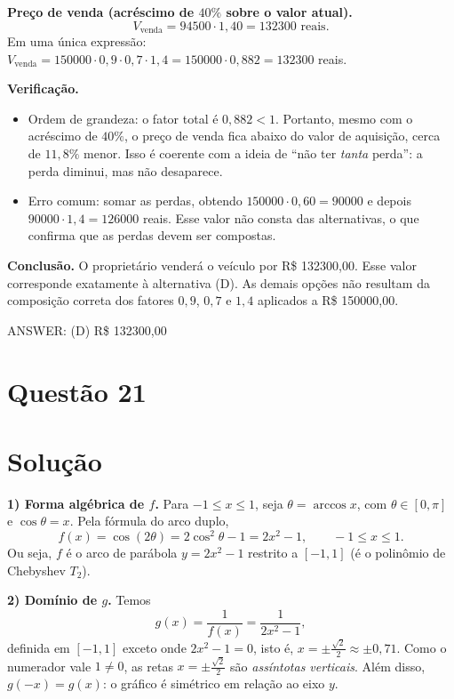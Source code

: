 \documentclass{article}%
\begin{document}
\textbf{Preço de venda (acréscimo de $40\%$ sobre o valor atual).}
\[
V_{\text{venda}} = 94500 \cdot 1{,}40 = 132300 \text{ reais}.
\]
Em uma única expressão: $V_{\text{venda}} = 150000\cdot 0{,}9\cdot 0{,}7\cdot 1{,}4 = 150000\cdot 0{,}882 = 132300$ reais.

\textbf{Verificação.}
\begin{itemize}
  \item Ordem de grandeza: o fator total é $0{,}882<1$. Portanto, mesmo com o acréscimo de $40\%$, o preço de venda fica abaixo do valor de aquisição, cerca de $11{,}8\%$ menor. Isso é coerente com a ideia de ``não ter \emph{tanta} perda'': a perda diminui, mas não desaparece.
  \item Erro comum: somar as perdas, obtendo $150000\cdot 0{,}60 = 90000$ e depois $90000\cdot 1{,}4 = 126000$ reais. Esse valor não consta das alternativas, o que confirma que as perdas devem ser compostas.
\end{itemize}

\textbf{Conclusão.} O proprietário venderá o veículo por R\$ 132300,00. Esse valor corresponde exatamente à alternativa (D). As demais opções não resultam da composição correta dos fatores $0{,}9$, $0{,}7$ e $1{,}4$ aplicados a R\$ 150000,00.

ANSWER: (D) R\$ 132300,00%
\newpage%
\section*{Questão 21}

\section*{Solução}

\textbf{1) Forma algébrica de $f$.} Para $-1\le x\le 1$, seja $\theta=\arccos x$, com $\theta\in[0,\pi]$ e $\cos\theta=x$. Pela fórmula do arco duplo,
\[
f(x)=\cos(2\theta)=2\cos^2\theta-1=2x^2-1,\qquad -1\le x\le 1 .
\]
Ou seja, $f$ é o arco de parábola $y=2x^2-1$ restrito a $[-1,1]$ (é o polinômio de Chebyshev $T_2$).

\textbf{2) Domínio de $g$.} Temos
\[
g(x)=\frac{1}{f(x)}=\frac{1}{2x^2-1},
\]
definida em $[-1,1]$ exceto onde $2x^2-1=0$, isto é, $x=\pm\frac{\sqrt2}{2}\approx\pm 0{,}71$. Como o numerador vale $1\neq 0$, as retas $x=\pm\frac{\sqrt2}{2}$ são \emph{assíntotas verticais}. Além disso, $g(-x)=g(x)$: o gráfico é simétrico em relação ao eixo $y$.
\end{document}
